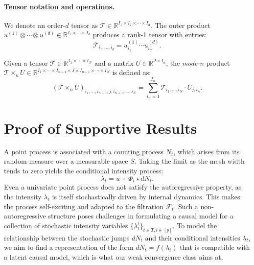 \documentclass[10pt]{article}
\numberwithin{figure}{section}
\begin{document}
\paragraph{Tensor notation and operations.}
We denote an order-\( d \) tensor as \( \mathcal{T} \in \mathbb{R}^{I_1 \times I_2 \times \cdots \times I_d} \). The outer product \( u^{(1)} \otimes \cdots \otimes u^{(d)} \in \mathbb{R}^{I_1 \times \cdots \times I_d} \) produces a rank-1 tensor with entries:
\[
\mathcal{T}_{i_1, \dots, i_d} = u^{(1)}_{i_1} \cdots u^{(d)}_{i_d}.
\]

Given a tensor \( \mathcal{T} \in \mathbb{R}^{I_1 \times \cdots \times I_N} \) and a matrix \( U \in \mathbb{R}^{J \times I_n} \), the \emph{mode-\( n \)} product \( \mathcal{T} \times_n U \in \mathbb{R}^{I_1 \times \cdots \times I_{n-1} \times J \times I_{n+1} \times \cdots \times I_N} \) is defined as:
\[
(\mathcal{T} \times_n U)_{i_1, \dots, i_{n-1}, j, i_{n+1}, \dots, i_N} = \sum_{i_n=1}^{I_n} \mathcal{T}_{i_1, \dots, i_N} \cdot U_{j, i_n}.
\]

\section{Proof of Supportive Results}\label{app:prop}
A point process is associated with a counting process $N_t$, which arises from its random measure over a measurable space $S$. Taking the limit as the mesh width tends to zero yields the conditional intensity process:
\begin{equation}
    \lambda_t = u + \Phi_t \star dN_t. \label{A:1.3}
\end{equation}
Even a univariate point process does not satisfy the autoregressive property, as the intensity $\lambda_t$ is itself stochastically driven by internal dynamics. This makes the process self-exciting and adapted to the filtration $\mathcal{F}_t$. Such a non-autoregressive structure poses challenges in formulating a causal model for a collection of stochastic intensity variables $\{\lambda^i_t\}_{t \in T, i \in [p]}$. To model the relationship between the stochastic jumps $dN_t$ and their conditional intensities $\lambda_t$, we aim to find a representation of the form $dN_t = f(\lambda_t)$ that is compatible with a latent causal model, which is what our weak convergence class aims at. 
\end{document}
